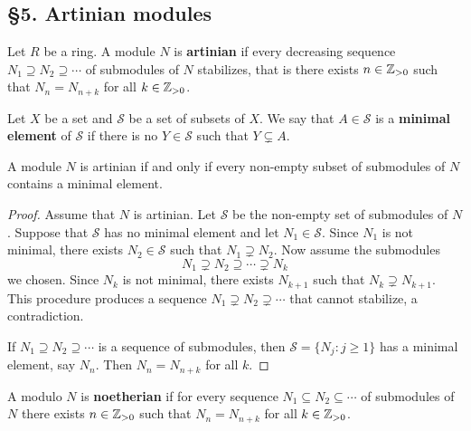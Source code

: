 \chapter{}

\section*{\S5. Artinian modules}

\begin{definition}
	Let $R$ be a ring. A module $N$ is \textbf{artinian} if every decreasing sequence 
	$N_1\supseteq N_2\supseteq\cdots$ of submodules of $N$ stabilizes, that is
	there exists $n\in\mathbb{Z}_{>0}$ such that 
	$N_n=N_{n+k}$ for all $k\in\mathbb{Z}_{>0}$.
\end{definition}

Let $X$ be a set and $\mathcal{S}$ be a set of subsets of $X$. 
We say that $A\in\mathcal{S}$ is a \textbf{minimal element} of $\mathcal{S}$
if there is no $Y\in\mathcal{S}$ such that $Y\subsetneq A$. 

\begin{proposition}
\label{pro:artinian_minimal}
	A module $N$ is artinian if and only if every non-empty subset of submodules of $N$ 
	contains a minimal element. 
\end{proposition}

\begin{proof}
	Assume that $N$ is artinian. Let $\mathcal{S}$ be the non-empty set of submodules of $N$. 
	Suppose that $\mathcal{S}$ has no minimal element and let $N_1\in\mathcal{S}$. 
	Since $N_1$ is not minimal, there exists 
	$N_2\in\mathcal{S}$ such that $N_1\supsetneq N_2$. Now assume the 
	submodules 
	\[
	N_1\supsetneq N_2\supseteq\cdots\supsetneq N_k
	\]
	we chosen. 
	Since $N_k$ is not minimal, there exists $N_{k+1}$ such that $N_k\supsetneq N_{k+1}$.
	This procedure produces a sequence $N_1\supsetneq
	N_2\supsetneq\cdots$ that cannot stabilize, a contradiction. 
	
	If $N_1\supseteq N_2\supseteq\cdots$ is a sequence of submodules, then 
	$\mathcal{S}=\{N_j:j\geq1\}$ has a minimal element, say $N_n$. Then
	$N_n=N_{n+k}$ for all $k$. 
\end{proof}

A modulo $N$ is \textbf{noetherian} if for every sequence 
$N_1\subseteq N_2\subseteq\cdots$ of submodules of $N$ there exists $n\in\mathbb{Z}_{>0}$ such that 
$N_n=N_{n+k}$ for all $k\in\mathbb{Z}_{>0}$. 


